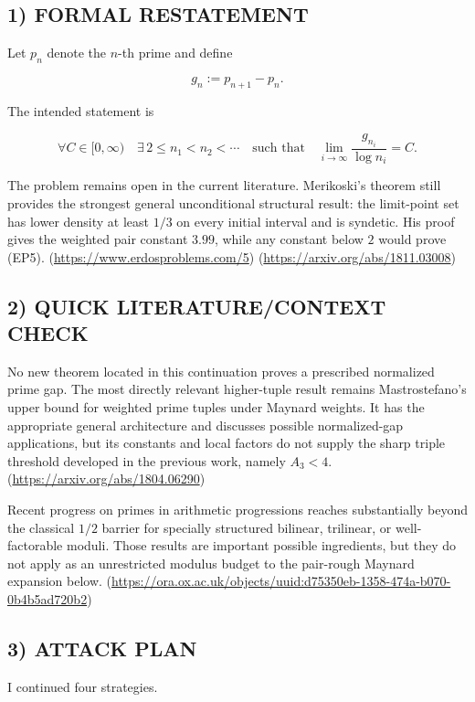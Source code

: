 \subsection*{1) FORMAL RESTATEMENT}

Let \(p_n\) denote the \(n\)-th prime and define

\[
g_n:=p_{n+1}-p_n.
\]

The intended statement is

\[
\forall C\in[0,\infty)\quad
\exists\,2\le n_1<n_2<\cdots
\quad\text{such that}\quad
\lim_{i\to\infty}\frac{g_{n_i}}{\log n_i}=C.
\tag{EP5}
\]

The problem remains open in the current literature. Merikoski's theorem still provides the strongest general unconditional structural result: the limit-point set has lower density at least \(1/3\) on every initial interval and is syndetic. His proof gives the weighted pair constant \(3.99\), while any constant below \(2\) would prove (EP5). (\url{https://www.erdosproblems.com/5}) (\url{https://arxiv.org/abs/1811.03008})

\subsection*{2) QUICK LITERATURE/CONTEXT CHECK}

No new theorem located in this continuation proves a prescribed normalized prime gap. The most directly relevant higher-tuple result remains Mastrostefano's upper bound for weighted prime tuples under Maynard weights. It has the appropriate general architecture and discusses possible normalized-gap applications, but its constants and local factors do not supply the sharp triple threshold developed in the previous work, namely \(A_3<4\). (\url{https://arxiv.org/abs/1804.06290})

Recent progress on primes in arithmetic progressions reaches substantially beyond the classical \(1/2\) barrier for specially structured bilinear, trilinear, or well-factorable moduli. Those results are important possible ingredients, but they do not apply as an unrestricted modulus budget to the pair-rough Maynard expansion below. (\url{https://ora.ox.ac.uk/objects/uuid:d75350eb-1358-474a-b070-0b4b5ad720b2})

\subsection*{3) ATTACK PLAN}

I continued four strategies.


